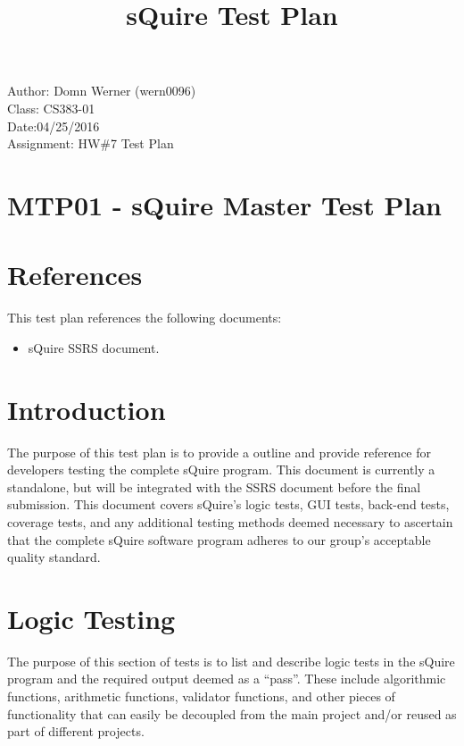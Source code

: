 \documentclass[14pt, a4paper]{article}
\begin{document}
\noindent Author: Domn Werner (wern0096) \\
Class: CS383-01 \\
Date:04/25/2016 \\
Assignment: HW\#7 Test Plan

\title{sQuire Test Plan}

\tableofcontents

\newpage

\section{MTP01 - sQuire Master Test Plan}

\section{References}

This test plan references the following documents:
\begin{itemize}
	\item sQuire SSRS document.
\end{itemize}

\section{Introduction}

The purpose of this test plan is to provide a outline and provide reference for developers testing the complete sQuire program. This document is currently a standalone, but will be integrated with the SSRS document before the final submission. This document covers sQuire's logic tests, GUI tests, back-end tests, coverage tests, and any additional testing methods deemed necessary to ascertain that the complete sQuire software program adheres to our group's acceptable quality standard.

\newpage

\section{Logic Testing}

The purpose of this section of tests is to list and describe logic tests in the sQuire program and the required output deemed as a ``pass''. These include algorithmic functions, arithmetic functions, validator functions, and other pieces of functionality that can easily be decoupled from the main project and/or reused as part of different projects.
\end{document}
